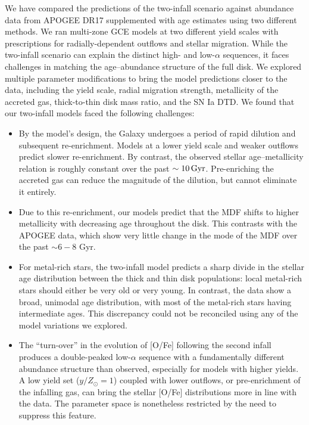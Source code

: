 \documentclass[twocolumn,twocolappendix,linenumbers]{aastex631}
\newcommand{\yZ}[1]{$y/Z_\odot=#1$}
\newcommand{\Gyr}{\,{\rm Gyr}}
\begin{document}
We have compared the predictions of the two-infall scenario against abundance data from APOGEE DR17 supplemented with age estimates using two different methods. We ran multi-zone GCE models at two different yield scales with prescriptions for radially-dependent outflows and stellar migration. While the two-infall scenario can explain the distinct high- and low-$\alpha$ sequences, it faces challenges in matching the age--abundance structure of the full disk. We explored multiple parameter modifications to bring the model predictions closer to the data, including the yield scale, radial migration strength, metallicity of the accreted gas, thick-to-thin disk mass ratio, and the SN Ia DTD. We found that our two-infall models faced the following challenges:

\begin{itemize}
    \item By the model's design, the Galaxy undergoes a period of rapid dilution and subsequent re-enrichment. Models at a lower yield scale and weaker outflows predict slower re-enrichment. By contrast, the observed stellar age--metallicity relation is roughly constant over the past $\sim10\Gyr$. Pre-enriching the accreted gas can reduce the magnitude of the dilution, but cannot eliminate it entirely.
    \item Due to this re-enrichment, our models predict that the MDF shifts to higher metallicity with decreasing age throughout the disk. This contrasts with the APOGEE data, which show very little change in the mode of the MDF over the past $\sim6-8$ Gyr.
    \item For metal-rich stars, the two-infall model predicts a sharp divide in the stellar age distribution between the thick and thin disk populations: local metal-rich stars should either be very old or very young. In contrast, the data show a broad, unimodal age distribution, with most of the metal-rich stars having intermediate ages. This discrepancy could not be reconciled using any of the model variations we explored.
    \item The ``turn-over'' in the evolution of [O/Fe] following the second infall produces a double-peaked low-$\alpha$ sequence with a fundamentally different abundance structure than observed, especially for models with higher yields. A low yield set (\yZ{1}) coupled with lower outflows, or pre-enrichment of the infalling gas, can bring the stellar [O/Fe] distributions more in line with the data. The parameter space is nonetheless restricted by the need to suppress this feature.
\end{itemize}
\end{document}
